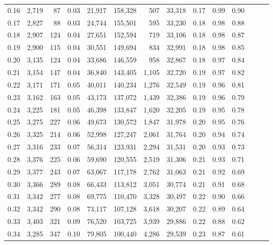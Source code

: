 \begin{tabular}{rrrrrrrrrrrrrr}
0.16 &  2,719 &   87 &  0.03 &   21,917 &  158,328 &     507 &  33,318 &  0.17 &  0.99 &      0.90 \\
0.17 &  2,827 &   88 &  0.03 &   24,744 &  155,501 &     595 &  33,230 &  0.18 &  0.98 &      0.88 \\
0.18 &  2,907 &  124 &  0.04 &   27,651 &  152,594 &     719 &  33,106 &  0.18 &  0.98 &      0.87 \\
0.19 &  2,900 &  115 &  0.04 &   30,551 &  149,694 &     834 &  32,991 &  0.18 &  0.98 &      0.85 \\
0.20 &  3,135 &  124 &  0.04 &   33,686 &  146,559 &     958 &  32,867 &  0.18 &  0.97 &      0.84 \\
0.21 &  3,154 &  147 &  0.04 &   36,840 &  143,405 &   1,105 &  32,720 &  0.19 &  0.97 &      0.82 \\
0.22 &  3,171 &  171 &  0.05 &   40,011 &  140,234 &   1,276 &  32,549 &  0.19 &  0.96 &      0.81 \\
0.23 &  3,162 &  163 &  0.05 &   43,173 &  137,072 &   1,439 &  32,386 &  0.19 &  0.96 &      0.79 \\
0.24 &  3,225 &  181 &  0.05 &   46,398 &  133,847 &   1,620 &  32,205 &  0.19 &  0.95 &      0.78 \\
0.25 &  3,275 &  227 &  0.06 &   49,673 &  130,572 &   1,847 &  31,978 &  0.20 &  0.95 &      0.76 \\
0.26 &  3,325 &  214 &  0.06 &   52,998 &  127,247 &   2,061 &  31,764 &  0.20 &  0.94 &      0.74 \\
0.27 &  3,316 &  233 &  0.07 &   56,314 &  123,931 &   2,294 &  31,531 &  0.20 &  0.93 &      0.73 \\
0.28 &  3,376 &  225 &  0.06 &   59,690 &  120,555 &   2,519 &  31,306 &  0.21 &  0.93 &      0.71 \\
0.29 &  3,377 &  243 &  0.07 &   63,067 &  117,178 &   2,762 &  31,063 &  0.21 &  0.92 &      0.69 \\
0.30 &  3,366 &  289 &  0.08 &   66,433 &  113,812 &   3,051 &  30,774 &  0.21 &  0.91 &      0.68 \\
0.31 &  3,342 &  277 &  0.08 &   69,775 &  110,470 &   3,328 &  30,497 &  0.22 &  0.90 &      0.66 \\
0.32 &  3,342 &  290 &  0.08 &   73,117 &  107,128 &   3,618 &  30,207 &  0.22 &  0.89 &      0.64 \\
0.33 &  3,403 &  321 &  0.09 &   76,520 &  103,725 &   3,939 &  29,886 &  0.22 &  0.88 &      0.62 \\
0.34 &  3,285 &  347 &  0.10 &   79,805 &  100,440 &   4,286 &  29,539 &  0.23 &  0.87 &      0.61 \\

\end{tabular}
